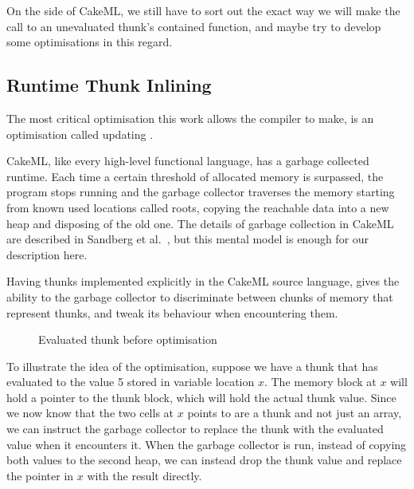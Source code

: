 On the side of CakeML, we still have to sort out the exact way we will make the
call to an unevaluated thunk's contained function, and maybe try to develop some
optimisations in this regard.

\subsection{Runtime Thunk Inlining}

The most critical optimisation this work allows the compiler to make, is an
optimisation called updating \cite{seward1992generational}.

CakeML, like every high-level functional language, has a garbage collected
runtime. Each time a certain threshold of allocated memory is surpassed, the
program stops running and the garbage collector traverses the memory starting
from known used locations called roots, copying the reachable data into a new
heap and disposing of the old one. The details of garbage collection in CakeML
are described in Sandberg et al.~\cite{sandberg2019verified}, but this mental
model is enough for our description here.

Having thunks implemented explicitly in the CakeML source language, gives the
ability to the garbage collector to discriminate between chunks of memory that
represent thunks, and tweak its behaviour when encountering them.

\usetikzlibrary{calc,shapes.multipart,chains,arrows}
\begin{figure}[h]
\centering
{}
  \caption{Evaluated thunk before optimisation}
\end{figure}

To illustrate the idea of the optimisation, suppose we have a thunk that has
evaluated to the value 5 stored in variable location $x$. The memory block at
$x$ will hold a pointer to the thunk block, which will hold the actual thunk
value. Since we now know that the two cells at $x$ points to are a thunk and not
just an array, we can instruct the garbage collector to replace the thunk with
the evaluated value when it encounters it. When the garbage collector is run,
instead of copying both values to the second heap, we can instead drop the
thunk value and replace the pointer in $x$ with the result directly.

